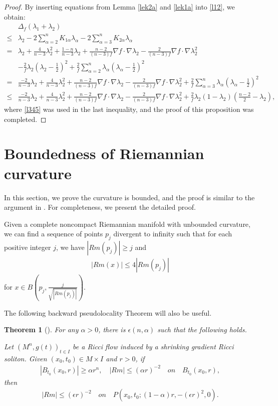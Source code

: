 \documentclass[12pt]{amsart}
\newcommand{\ban}{\begin{eqnarray*}}
\newcommand{\ean}{\end{eqnarray*}}
\newtheorem{theo}{Theorem}[section]
\begin{document}
	\begin{proof} By inserting equations from Lemma \ref{lek2a} and \ref{lek1a} into \eqref{l12}, we obtain:
		\begin{equation*}
		\begin{aligned}
		&\Delta_f(\lambda_1+\lambda_2)\\
		\leq&\lambda_2-2\sum_{\alpha=2}^nK_{1\alpha}\lambda_\alpha-2\sum_{\alpha=3}^nK_{2\alpha}\lambda_\alpha\\
		=&\lambda_2+\frac{4}{n-3}\lambda_2^2+\frac{1-n}{n-3}\lambda_2+\frac{n-2}{(n-3)f}\nabla f\cdot \nabla \lambda_2-\frac{2}{(n-3)f}\nabla f\cdot \nabla \lambda_2^2\\
&-\frac{2}{f}\lambda_2(\lambda_2-\frac{1}{2})^2+\frac{2}{f}\sum_{\alpha=2}^n \lambda_\alpha(\lambda_\alpha-\frac{1}{2})^2\\
=&\frac{-2}{n-3}\lambda_2+\frac{4}{n-3}\lambda_2^2+\frac{n-2}{(n-3)f}\nabla f\cdot \nabla \lambda_2-\frac{2}{(n-3)f}\nabla f\cdot \nabla \lambda_2^2+\frac{2}{f}\sum_{\alpha=3}^n\lambda_\alpha(\lambda_\alpha-\frac{1}{2})^2\\
\leq &\frac{-2}{n-3}\lambda_2+\frac{4}{n-3}\lambda_2^2+\frac{n-2}{(n-3)f}\nabla f\cdot \nabla \lambda_2-\frac{2}{(n-3)f}\nabla f\cdot \nabla \lambda_2^2+\frac{2}{f}\lambda_2(1-\lambda_2)(\frac{n-2}{2}-\lambda_2),
		\end{aligned}
		\end{equation*}	
		where \eqref{l345} was used in the last inequality, and the proof of this proposition was completed.
	\end{proof}
	

	
	\section{Boundedness of Riemannian curvature}\label{sec4}
In this section, we prove the curvature is bounded, and the proof is similar to the argument in \cite{Li-Ou-Qu-Wu}. For completeness, we present the detailed proof.

\begin{lem}\label{point picking}
	Given a complete noncompact Riemannian manifold with unbounded curvature, we can find a sequence of points $p_j$ divergent to infinity such that for each positive integer $j$, we have $|Rm(p_j)|\geq j$ and
	\ban
	|Rm(x)|\leq 4 |Rm(p_j)|
	\ean
	for $x\in B(p_j, \frac{j}{\sqrt{|Rm(p_j)|}})$.
\end{lem}
The following backward pseudolocality Theorem will also be useful.
\begin{theo}[\cite{Li-Wang2}]\label{backward pseudolocality} For any $\alpha>0$, there is $\epsilon(n, \alpha)$ such that the following holds.

 Let $(M^n, g(t))_{t\in I}$ be a Ricci flow induced by a shrinking gradient Ricci soliton. Given $(x_0, t_0)\in M\times I$ and $r>0$, if
 \ban
 |B_{t_0}(x_0, r)|\geq \alpha r^n, \quad |Rm|\leq (\alpha r)^{-2} \quad on \quad B_{t_0}(x_0, r),
 \ean
 then
 \ban
 |Rm|\leq (\epsilon r)^{-2}  \quad on \quad P(x_0, t_0; (1-\alpha)r, -(\epsilon r)^2, 0).
 \ean
\end{theo}
\end{document}
